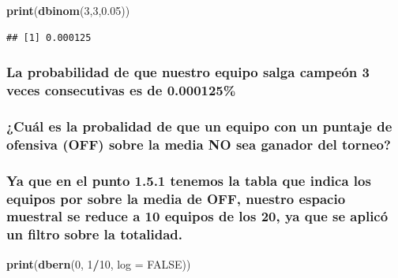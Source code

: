 \documentclass[]{article}
\newenvironment{Shaded}{\begin{snugshade}}{\end{snugshade}}
\newcommand{\DataTypeTok}[1]{\textcolor[rgb]{0.13,0.29,0.53}{#1}}
\newcommand{\DecValTok}[1]{\textcolor[rgb]{0.00,0.00,0.81}{#1}}
\newcommand{\FloatTok}[1]{\textcolor[rgb]{0.00,0.00,0.81}{#1}}
\newcommand{\KeywordTok}[1]{\textcolor[rgb]{0.13,0.29,0.53}{\textbf{#1}}}
\newcommand{\NormalTok}[1]{#1}
\newcommand{\OperatorTok}[1]{\textcolor[rgb]{0.81,0.36,0.00}{\textbf{#1}}}
\newcommand{\OtherTok}[1]{\textcolor[rgb]{0.56,0.35,0.01}{#1}}
\begin{document}
\begin{Shaded}
\begin{Highlighting}[]
\KeywordTok{print}\NormalTok{(}\KeywordTok{dbinom}\NormalTok{(}\DecValTok{3}\NormalTok{,}\DecValTok{3}\NormalTok{,}\FloatTok{0.05}\NormalTok{))}
\end{Highlighting}
\end{Shaded}

\begin{verbatim}
## [1] 0.000125
\end{verbatim}

\hypertarget{la-probabilidad-de-que-nuestro-equipo-salga-campeon-3-veces-consecutivas-es-de-0.000125}{%
\subsubsection{La probabilidad de que nuestro equipo salga campeón 3
veces consecutivas es de
0.000125\%}\label{la-probabilidad-de-que-nuestro-equipo-salga-campeon-3-veces-consecutivas-es-de-0.000125}}

\hypertarget{cual-es-la-probalidad-de-que-un-equipo-con-un-puntaje-de-ofensiva-off-sobre-la-media-no-sea-ganador-del-torneo}{%
\subsubsection{¿Cuál es la probalidad de que un equipo con un puntaje de
ofensiva (OFF) sobre la media NO sea ganador del
torneo?}\label{cual-es-la-probalidad-de-que-un-equipo-con-un-puntaje-de-ofensiva-off-sobre-la-media-no-sea-ganador-del-torneo}}

\hypertarget{ya-que-en-el-punto-1.5.1-tenemos-la-tabla-que-indica-los-equipos-por-sobre-la-media-de-off-nuestro-espacio-muestral-se-reduce-a-10-equipos-de-los-20-ya-que-se-aplico-un-filtro-sobre-la-totalidad.}{%
\subsubsection{Ya que en el punto 1.5.1 tenemos la tabla que indica los
equipos por sobre la media de OFF, nuestro espacio muestral se reduce a
10 equipos de los 20, ya que se aplicó un filtro sobre la
totalidad.}\label{ya-que-en-el-punto-1.5.1-tenemos-la-tabla-que-indica-los-equipos-por-sobre-la-media-de-off-nuestro-espacio-muestral-se-reduce-a-10-equipos-de-los-20-ya-que-se-aplico-un-filtro-sobre-la-totalidad.}}

\begin{Shaded}
\begin{Highlighting}[]
\KeywordTok{print}\NormalTok{(}\KeywordTok{dbern}\NormalTok{(}\DecValTok{0}\NormalTok{, }\DecValTok{1}\OperatorTok{/}\DecValTok{10}\NormalTok{, }\DataTypeTok{log =} \OtherTok{FALSE}\NormalTok{))}
\end{Highlighting}
\end{Shaded}
\end{document}
